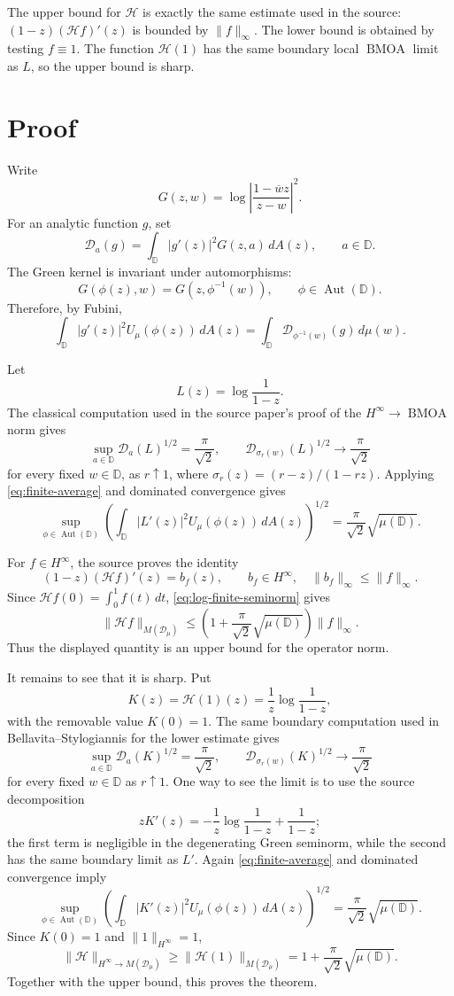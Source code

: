 \documentclass[11pt]{article}
\newcommand{\D}{\mathbb D}
\newcommand{\Aut}{\operatorname{Aut}(\D)}
\newcommand{\HH}{\mathcal H}
\newcommand{\BMOA}{\operatorname{BMOA}}
\newcommand{\MD}{M(\mathcal D_\mu)}
\newcommand{\dA}{\,dA}
\begin{document}
The upper bound for \(\HH\) is exactly the same estimate used in the source:
\((1-z)(\HH f)'(z)\) is bounded by \(\|f\|_\infty\).  The lower bound is obtained
by testing \(f\equiv 1\).  The function \(\HH(1)\) has the same boundary local
\(\BMOA\) limit as \(L\), so the upper bound is sharp.

\section*{Proof}

Write
\[
G(z,w)=\log\left|\frac{1-\overline w z}{z-w}\right|^2.
\]
For an analytic function \(g\), set
\[
 \mathcal D_a(g)=\int_{\D}|g'(z)|^2G(z,a)\dA(z),\qquad a\in\D.
\]
The Green kernel is invariant under automorphisms:
\[
 G(\phi(z),w)=G(z,\phi^{-1}(w)),\qquad \phi\in\Aut .
\]
Therefore, by Fubini,
\begin{equation}\label{eq:finite-average}
\int_{\D}|g'(z)|^2U_\mu(\phi(z))\dA(z)
=
\int_{\D}\mathcal D_{\phi^{-1}(w)}(g)\,d\mu(w).
\end{equation}

Let
\[
 L(z)=\log\frac1{1-z}.
\]
The classical computation used in the source paper's proof of the
\(H^\infty\to\BMOA\) norm gives
\[
 \sup_{a\in\D}\mathcal D_a(L)^{1/2}=\frac{\pi}{\sqrt2},
 \qquad
 \mathcal D_{\sigma_r(w)}(L)^{1/2}\longrightarrow \frac{\pi}{\sqrt2}
\]
for every fixed \(w\in\D\), as \(r\uparrow 1\), where
\(\sigma_r(z)=(r-z)/(1-rz)\).  Applying \eqref{eq:finite-average} and dominated
convergence gives
\begin{equation}\label{eq:log-finite-seminorm}
\sup_{\phi\in\Aut}\left(\int_{\D}|L'(z)|^2U_\mu(\phi(z))\dA(z)\right)^{1/2}
=\frac{\pi}{\sqrt2}\sqrt{\mu(\D)}.
\end{equation}

For \(f\in H^\infty\), the source proves the identity
\[
 (1-z)(\HH f)'(z)=b_f(z),\qquad b_f\in H^\infty,\quad
 \|b_f\|_\infty\leq \|f\|_\infty .
\]
Since \(\HH f(0)=\int_0^1 f(t)\,dt\), \eqref{eq:log-finite-seminorm} gives
\[
\|\HH f\|_{\MD}
\leq
\left(1+\frac{\pi}{\sqrt2}\sqrt{\mu(\D)}\right)\|f\|_\infty .
\]
Thus the displayed quantity is an upper bound for the operator norm.

It remains to see that it is sharp.  Put
\[
 K(z)=\HH(1)(z)=\frac1z\log\frac1{1-z},
\]
with the removable value \(K(0)=1\).  The same boundary computation used in
Bellavita--Stylogiannis for the lower estimate gives
\[
 \sup_{a\in\D}\mathcal D_a(K)^{1/2}=\frac{\pi}{\sqrt2},
 \qquad
 \mathcal D_{\sigma_r(w)}(K)^{1/2}\longrightarrow \frac{\pi}{\sqrt2}
\]
for every fixed \(w\in\D\) as \(r\uparrow1\).  One way to see the limit is to
use the source decomposition
\[
 zK'(z)=-\frac1z\log\frac1{1-z}+\frac1{1-z};
\]
the first term is negligible in the degenerating Green seminorm, while the
second has the same boundary limit as \(L'\).
Again \eqref{eq:finite-average} and dominated convergence imply
\[
\sup_{\phi\in\Aut}\left(\int_{\D}|K'(z)|^2U_\mu(\phi(z))\dA(z)\right)^{1/2}
=\frac{\pi}{\sqrt2}\sqrt{\mu(\D)}.
\]
Since \(K(0)=1\) and \(\|1\|_{H^\infty}=1\),
\[
 \|\HH\|_{H^\infty\to\MD}
 \geq
 \|\HH(1)\|_{\MD}
 =
 1+\frac{\pi}{\sqrt2}\sqrt{\mu(\D)}.
\]
Together with the upper bound, this proves the theorem.
\end{document}
